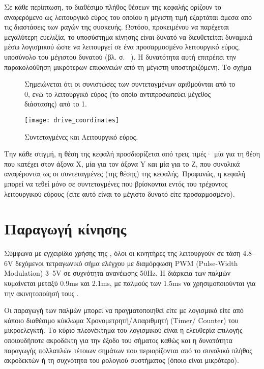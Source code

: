 Σε κάθε περίπτωση, το διαθέσιμο πλήθος θέσεων της κεφαλής ορίζουν το αναφερόμενο
ως λειτουργικό εύρος του οποίου η μέγιστη τιμή εξαρτάται άμεσα από τις
διαστάσεις των ραγών της συσκευής. Ωστόσο, προκειμένου να παρέχεται
μεγαλύτερη ευελιξία, το υποσύστημα κίνησης είναι δυνατό να διευθετείται δυναμικά
μέσω λογισμικού ώστε να λειτουργεί σε ένα προσαρμοσμένο λειτουργικό εύρος,
υποσύνολο του μέγιστου δυνατού (βλ.  σ.~%
\pageref{subsec:network:config}).
Η δυνατότητα αυτή επιτρέπει την παρακολούθηση μικρότερων επιφανειών από τη
μέγιστη υποστηριζόμενη. Το σχήμα

\begin{figure}
    \caption{Συντεταγμένες και Λειτουργικό εύρος.\label{fig:motor:coordinates}}
    Σημειώνεται ότι οι συνιστώσες των  συντεταγμένων αριθμούνται από το 0, ενώ
    το λειτουργικό εύρος (το οποίο αντιπροσωπεύει μέγεθος διάστασης) από το 1.
    \begin{center}
    \texttt{[image: drive\_coordinates]}
    \end{center}
\end{figure}


Την κάθε στιγμή, η θέση της κεφαλή προσδιορίζεται από τρεις τιμές· μία για τη
θέση που κατέχει στον άξονα X, μία για τον άξονα Y και μία για το Z, που
συνολικά αναφέρονται ως οι συντεταγμένες (της θέσης) της κεφαλής. Προφανώς,
η κεφαλή μπορεί να τεθεί μόνο σε συντεταγμένες που βρίσκονται εντός του
τρέχοντος λειτουργικού εύρους (είτε αυτό είναι το μέγιστο δυνατό είτε
προσαρμοσμένο).


\section{Παραγωγή κίνησης}
\label{sec:motor:motion}

Σύμφωνα με εγχειρίδιο χρήσης της \textcite{hitec02}, όλοι οι κινητήρες της
λειτουργούν σε τάση 4.8--6V δεχόμενοι τετραγωνικό σήμα ελέγχου με διαμόρφωση
PWM (\textenglish{Pulse-Width Modulation}) 3--5V σε συχνότητα ανανέωσης 50Hz.
Η διάρκεια των παλμών κυμαίνεται μεταξύ 0.9ms και 2.1ms, με παλμούς των 1.5ms να
χρησιμοποιούνται για την ακινητοποίησή τους \parencite{hitec02}.

Οι παραγωγή των παλμών μπορεί να πραγματοποιηθεί είτε με λογισμικό είτε από
κάποιο διαθέσιμο κύκλωμα Χρονομετρητή\slash Απαριθμητή (\textenglish{Timer\slash
Counter}) του μικροελεγκτή. Το κύριο πλεονέκτημα του λογισμικού είναι η
ελευθερία επιλογής οποιουδήποτε ακροδέκτη για την έξοδο του σήματος καθώς και η
δυνατότητα παραγωγής πολλαπλών τέτοιων σημάτων που περιορίζονται από το συνολικό
πλήθος ακροδεκτών ή τη συχνότητα του ρολογιού συστήματος (όποιο είναι
μικρότερο).


